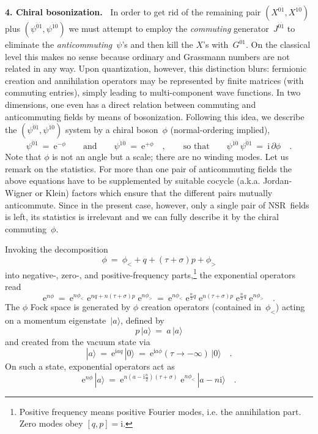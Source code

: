 \documentclass[a4paper,11pt]{article}
\def\s{\sigma}
\def\t{\tau}
\def\j{\psi}
\def\e{\textrm{e}}
\def\i{\textrm{i}}
\def\pa{\mbox{$\partial$}}
\def\zd{{\dot{0}}}
\def\od{{\dot{1}}}
\def\zdd{{\ddot{0}}}
\def\odd{{\ddot{1}}}
\begin{document}
\bigskip\noindent
{\bf 4. Chiral bosonization.\ }
In order to get rid of the remaining pair
$(X^{0\od},X^{1\zd})$ plus $(\j^{\zdd\od},\j^{\odd\zd})$
we must attempt to employ the {\it commuting\/} generator~$J^{\zdd\odd}$
to eliminate the {\it anticommuting\/}~$\j$'s and then kill the $X$'s 
with~$G^{\zdd 1}$.
On the classical level this makes no sense because ordinary and Grassmann
numbers are not related in any way. Upon quantization, however, this
distinction blurs: fermionic creation and annihilation operators may be
represented by finite matrices (with commuting entries), simply leading to
multi-component wave functions. In two dimensions, one even has a direct
relation between commuting and anticommuting fields by means of bosonization.
Following this idea, we describe the $(\j^{\zdd\od},\j^{\odd\zd})$ system
by a chiral boson~$\phi$ (normal-ordering implied),
\begin{equation} \label{bosonize}
\j^{\zdd\od}\ =\ \e^{-\phi} 
\qquad\textrm{and}\qquad
\j^{\odd\zd}\ =\ \e^{+\phi} \quad,
\qquad\textrm{so that}\qquad
\j^{\odd\zd}\,\j^{\zdd\od}\ =\ \i\,\pa\phi \quad.
\end{equation}
Note that $\phi$ is not an angle but a scale; there are no winding modes.
Let us remark on the statistics. 
For more than one pair of anticommuting fields the above equations have
to be supplemented by suitable cocycle (a.k.a. Jordan-Wigner or Klein) factors
which ensure that the different pairs mutually anticommute.
Since in the present case, however, only a single pair of NSR~fields is left,
its statistics is irrelevant and we can fully describe it by the 
chiral commuting~$\phi$.

Invoking the decomposition
\begin{equation}
\phi\ =\ \phi_< + q + (\t{+}\s)p + \phi_> 
\end{equation}
into negative-, zero-, and positive-frequency parts,\footnote{
Positive frequency means positive Fourier modes, i.e. the annihilation part.
Zero modes obey $[q,p]=\i$.}
the exponential operators read
\begin{equation}
\e^{n\phi}\ =\ \e^{n\phi_<}\;\e^{nq+n(\t{+}\s)p}\;\e^{n\phi_>}\ =\
\e^{n\phi_<}\;\e^{\frac{n}{2}q}\;\e^{n(\t{+}\s)p}\;\e^{\frac{n}{2}q}\;
\e^{n\phi_>} \quad.
\end{equation}
The $\phi$ Fock space is generated by $\phi$ creation operators 
(contained in~$\phi_<$) acting on a momentum eigenstate~$|a\rangle$, defined by
\begin{equation}
p\,|a\rangle\ =\ a\,|a\rangle 
\end{equation}
and created from the vacuum state via
\begin{equation}
|a\rangle\ =\ \e^{\i a q}\,|0\rangle\ =\ 
\e^{\i a\phi}(\t{\to}{-}\infty)\,|0\rangle \quad.
\end{equation}
On such a state, exponential operators act as
\begin{equation}
\e^{n\phi}\,|a\rangle\ =\ 
\e^{n(a-\i\frac{n}{2})(\t+\s)}\;\e^{n\phi_<}\, |a{-}n\i\rangle \quad.
\end{equation}
\end{document}

